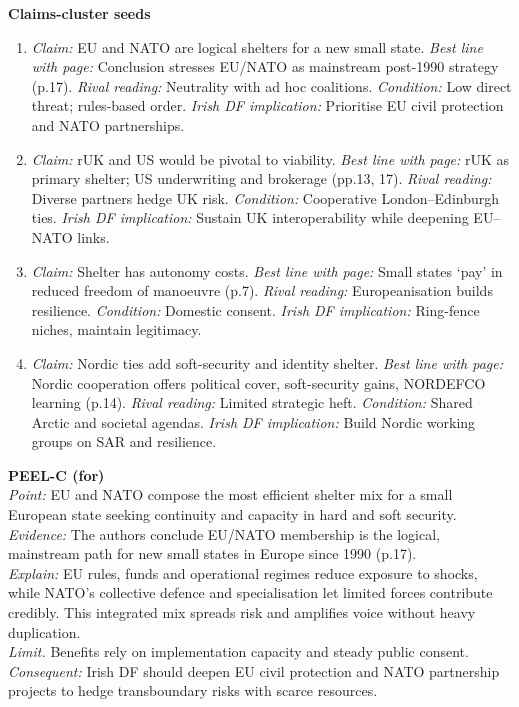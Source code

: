 \textbf{Claims-cluster seeds}
\begin{enumerate}
	\item \textit{Claim:} EU and NATO are logical shelters for a new small state. \textit{Best line with page:} Conclusion stresses EU/NATO as mainstream post-1990 strategy (p.17). \textit{Rival reading:} Neutrality with ad hoc coalitions. \textit{Condition:} Low direct threat; rules-based order. \textit{Irish DF implication:} Prioritise EU civil protection and NATO partnerships.
	\item \textit{Claim:} rUK and US would be pivotal to viability. \textit{Best line with page:} rUK as primary shelter; US underwriting and brokerage (pp.13, 17). \textit{Rival reading:} Diverse partners hedge UK risk. \textit{Condition:} Cooperative London–Edinburgh ties. \textit{Irish DF implication:} Sustain UK interoperability while deepening EU–NATO links.
	\item \textit{Claim:} Shelter has autonomy costs. \textit{Best line with page:} Small states ‘pay’ in reduced freedom of manoeuvre (p.7). \textit{Rival reading:} Europeanisation builds resilience. \textit{Condition:} Domestic consent. \textit{Irish DF implication:} Ring-fence niches, maintain legitimacy.
	\item \textit{Claim:} Nordic ties add soft-security and identity shelter. \textit{Best line with page:} Nordic cooperation offers political cover, soft-security gains, NORDEFCO learning (p.14). \textit{Rival reading:} Limited strategic heft. \textit{Condition:} Shared Arctic and societal agendas. \textit{Irish DF implication:} Build Nordic working groups on SAR and resilience.
\end{enumerate}

\textbf{PEEL-C (for)}\\
\textit{Point:} EU and NATO compose the most efficient shelter mix for a small European state seeking continuity and capacity in hard and soft security.\\
\textit{Evidence:} The authors conclude EU/NATO membership is the logical, mainstream path for new small states in Europe since 1990 (p.17).\\
\textit{Explain:} EU rules, funds and operational regimes reduce exposure to shocks, while NATO’s collective defence and specialisation let limited forces contribute credibly. This integrated mix spreads risk and amplifies voice without heavy duplication.\\
\textit{Limit.} Benefits rely on implementation capacity and steady public consent.\\
\textit{Consequent:} Irish DF should deepen EU civil protection and NATO partnership projects to hedge transboundary risks with scarce resources.

